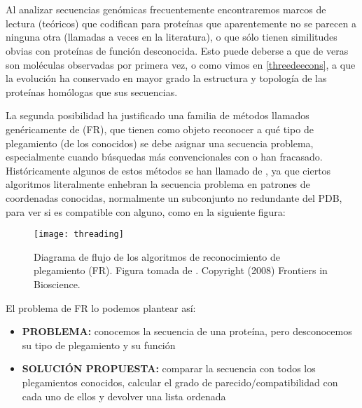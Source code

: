 \section{} \label{FRsection}

Al analizar secuencias gen\'{o}micas frecuentemente encontraremos marcos de lectura (te\'{o}ricos) que codifican para prote\'{i}nas que aparentemente no se parecen a ninguna otra (llamadas a veces  en la literatura), 
o que s\'{o}lo tienen similitudes obvias con prote\'{i}nas de funci\'{o}n desconocida. Esto puede deberse a que de veras son 
mol\'{e}culas observadas por primera vez, o como vimos en \ref{threedeecons}, a que la evoluci\'{o}n ha conservado en mayor grado
la estructura y topolog\'{i}a de las prote\'{i}nas hom\'{o}logas que sus secuencias. 

La segunda posibilidad ha justificado una familia de m\'{e}todos llamados gen\'{e}ricamente de  (FR), 
que tienen como objeto reconocer a qu\'{e} tipo de plegamiento (de los conocidos) se debe asignar una secuencia problema, 
especialmente cuando b\'{u}squedas m\'{a}s convencionales con 
 o 
han fracasado.
Hist\'{o}ricamente algunos de estos m\'{e}todos se han llamado de
, 
ya que ciertos algoritmos 
literalmente enhebran la secuencia problema en patrones de coordenadas conocidas, normalmente un subconjunto no redundante
del PDB, para ver si es compatible con alguno, como en la siguiente figura:

\begin{figure}
\begin{center} 
\texttt{[image: threading]}
\caption%
{
Diagrama de flujo de los algoritmos de reconocimiento de plegamiento (FR).
Figura tomada de \cite{Guo2008}. Copyright (2008) Frontiers in Bioscience. 
}
\label{fig:threading}
\end{center}
\end{figure}

El problema de FR lo podemos plantear as\'{i}:
\begin{itemize}
\item \textbf{PROBLEMA:} conocemos la secuencia de una prote\'{i}na, pero desconocemos su tipo de plegamiento y su funci\'{o}n
\item \textbf{SOLUCI\'{O}N PROPUESTA:} comparar la secuencia con todos los plegamientos conocidos, calcular el grado de parecido/compatibilidad con cada uno de ellos y devolver una lista ordenada
\end{itemize}

